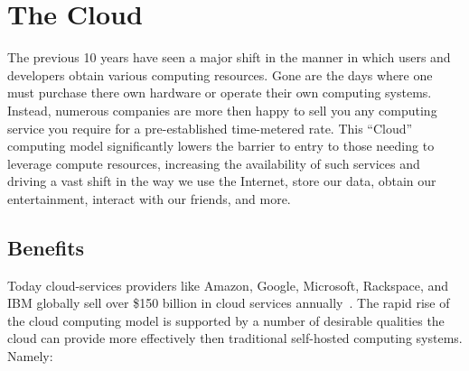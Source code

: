 \section{The Cloud}

The previous 10 years have seen a major shift in the manner in which
users and developers obtain various computing resources. Gone are the
days where one must purchase there own hardware or operate their own
computing systems. Instead, numerous companies are more then happy to
sell you any computing service you require for a pre-established
time-metered rate. This ``Cloud'' computing model significantly lowers
the barrier to entry to those needing to leverage compute resources,
increasing the availability of such services and driving a vast shift
in the way we use the Internet, store our data, obtain our
entertainment, interact with our friends, and more.

\subsection{Benefits}

Today cloud-services providers like Amazon, Google, Microsoft,
Rackspace, and IBM globally sell over \$150 billion in cloud services
annually~\cite{flood2013}. The rapid rise of the cloud computing model
is supported by a number of desirable qualities the cloud can provide
more effectively then traditional self-hosted computing
systems. Namely:

